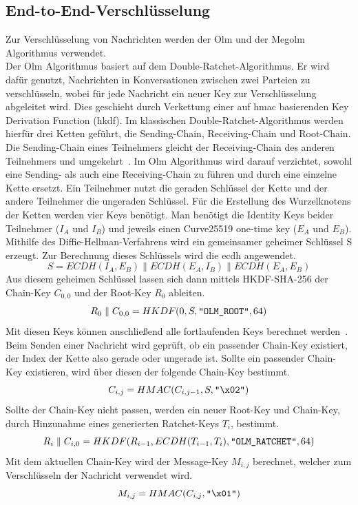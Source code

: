     \subsection{End-to-End-Verschlüsselung}\label{subsec:verwendete-schlussel}
    Zur Verschlüsselung von Nachrichten werden der Olm und der Megolm Algorithmus verwendet.\\
    Der Olm Algorithmus basiert auf dem Double-Ratchet-Algorithmus.
    Er wird dafür genutzt, Nachrichten in Konversationen zwischen zwei Parteien zu verschlüsseln, wobei für jede Nachricht ein neuer Key zur Verschlüsselung abgeleitet wird.
    Dies geschieht durch Verkettung einer auf \acs{hmac} basierenden Key Derivation Function (\acs{hkdf}).
    Im klassischen Double-Ratchet-Algorithmus werden hierfür drei Ketten geführt, die Sending-Chain, Receiving-Chain und Root-Chain.
    Die Sending-Chain eines Teilnehmers gleicht der Receiving-Chain des anderen Teilnehmers und umgekehrt~\cite{perrin2016double}.
    Im Olm Algorithmus wird darauf verzichtet, sowohl eine Sending- als auch eine Receiving-Chain zu führen und durch eine einzelne Kette ersetzt.
    Ein Teilnehmer nutzt die geraden Schlüssel der Kette und der andere Teilnehmer die ungeraden Schlüssel.
    Für die Erstellung des Wurzelknotens der Ketten werden vier Keys benötigt.
    Man benötigt die Identity Keys beider Teilnehmer ($I_A$ und $I_B$) und jeweils einen Curve25519 one-time key ($E_A$ und $E_B$).
    Mithilfe des Diffie-Hellman-Verfahrens wird ein gemeinsamer geheimer Schlüssel S erzeugt.
    Zur Berechnung dieses Schlüssels wird die \ac{ecdh} angewendet.
    \begin{displaymath}
        S = ECDH(I_A,E_B)\parallel ECDH(E_A,I_B) \parallel ECDH(E_A,E_B)
    \end{displaymath}
    Aus diesem geheimen Schlüssel lassen sich dann mittels HKDF-SHA-256 der Chain-Key $C_{0,0}$ und der Root-Key $R_0$ ableiten.
    \begin{displaymath}
        R_0 \parallel C_{0,0} = HKDF(0,S,\verb+"OLM_ROOT"+,64)
    \end{displaymath}
    Mit diesen Keys können anschließend alle fortlaufenden Keys berechnet werden~\cite{olm}.
    Beim Senden einer Nachricht wird geprüft, ob ein passender Chain-Key existiert, der Index der Kette also gerade oder ungerade ist.
    Sollte ein passender Chain-Key existieren, wird über diesen der folgende Chain-Key bestimmt.
    \begin{displaymath}
        C_{i,j} = HMAC(C_{i,j-1},S,\verb+"\x02"+)
    \end{displaymath}
    Sollte der Chain-Key nicht passen, werden ein neuer Root-Key und Chain-Key, durch Hinzunahme eines generierten Ratchet-Keys $T_i$, bestimmt.
    \begin{displaymath}
        R_i \parallel C_{i,0} = HKDF(R_{i-1},ECDH(T_{i-1},T_i),\verb+"OLM_RATCHET"+,64)
    \end{displaymath}
    Mit dem aktuellen Chain-Key wird der Message-Key $M_{i,j}$ berechnet, welcher zum Verschlüsseln der Nachricht verwendet wird.
    \begin{displaymath}
       M_{i,j} = HMAC(C_{i,j},\verb+"\x01"+)
    \end{displaymath}

